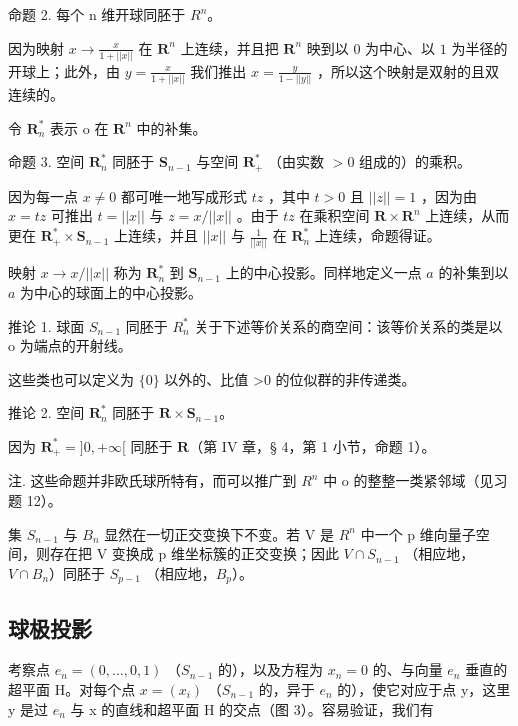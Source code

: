 命题 2. 每个 n 维开球同胚于 \(R^{n}\)。

因为映射 \(x \to \frac{x}{1 + ||x||}\) 在 \(\mathbf{R}^n\) 上连续，并且把 \(\mathbf{R}^n\) 映到以 \(0\) 为中心、以 \(1\) 为半径的开球上；此外，由 \(y = \frac{x}{1 + ||x||}\) 我们推出 \(x = \frac{y}{1 - ||y||}\) ，所以这个映射是双射的且双连续的。

令 \(\mathbf{R}_n^*\) 表示 o 在 \(\mathbf{R}^n\) 中的补集。

命题 3. 空间 \(\mathbf{R}_n^*\) 同胚于 \(\mathbf{S}_{n-1}\) 与空间 \(\mathbf{R}_+^*\) （由实数 \(>0\) 组成的）的乘积。

因为每一点 \(x \neq 0\) 都可唯一地写成形式 \(tz\) ，其中 \(t > 0\) 且 \(||z|| = 1\) ，因为由 \(x = tz\) 可推出 \(t = ||x||\) 与 \(z = x / ||x||\) 。由于 \(tz\) 在乘积空间 \(\mathbf{R} \times \mathbf{R}^n\) 上连续，从而更在 \(\mathbf{R}_+^* \times \mathbf{S}_{n-1}\) 上连续，并且 \(||x||\) 与 \(\frac{1}{||x||}\) 在 \(\mathbf{R}_n^*\) 上连续，命题得证。

映射 \(x \to x / ||x||\) 称为 \(\mathbf{R}_n^*\) 到 \(\mathbf{S}_{n-1}\) 上的中心投影。同样地定义一点 \(a\) 的补集到以 \(a\) 为中心的球面上的中心投影。

推论 1. 球面 \(S_{n-1}\) 同胚于 \(R_{n}^{*}\) 关于下述等价关系的商空间：该等价关系的类是以 o 为端点的开射线。

这些类也可以定义为 \(\{0\}\) 以外的、比值 \textgreater0 的位似群的非传递类。

推论 2. 空间 \(\mathbf{R}_n^*\) 同胚于 \(\mathbf{R} \times \mathbf{S}_{n-1}\)。

因为 \(\mathbf{R}_{+}^{*} = ]0, +\infty[\) 同胚于 \(\mathbf{R}\)（第 IV 章，§ 4，第 1 小节，命题 1）。

注. 这些命题并非欧氏球所特有，而可以推广到 \(R^{n}\) 中 o 的整整一类紧邻域（见习题 12）。

集 \(S_{n-1}\) 与 \(B_{n}\) 显然在一切正交变换下不变。若 V 是 \(R^{n}\) 中一个 p 维向量子空间，则存在把 V 变换成 p 维坐标簇的正交变换；因此 \(V \cap S_{n-1}\) （相应地，\(V \cap B_{n}\)）同胚于 \(S_{p-1}\) （相应地，\(B_{p}\)）。

\subsection{球极投影}

考察点 \(e_{n}=(0,\ldots,0,1)\) （\(S_{n-1}\) 的），以及方程为 \(x_{n}=0\) 的、与向量 \(e_{n}\) 垂直的超平面 H。对每个点 \(x=(x_{i})\) （\(S_{n-1}\) 的，异于 \(e_{n}\) 的），使它对应于点 y，这里 y 是过 \(e_{n}\) 与 x 的直线和超平面 H 的交点（图 3）。容易验证，我们有


